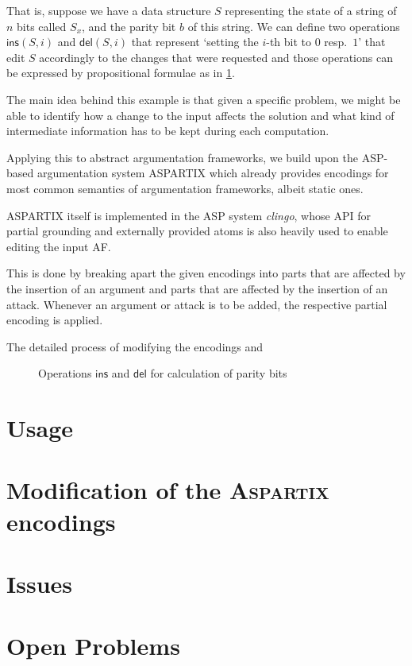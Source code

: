 \documentclass[oneside,12pt]{amsart}
\begin{document}
That is, suppose we have a data structure $S$ representing the state of a
string of $n$ bits called $S_x$, and the parity bit $b$ of this string.
We can define two operations $\mathsf{ins}(S,i)$ and $\mathsf{del}(S,i)$ 
that represent `setting the $i$-th bit to $0$ resp.\ $1$' that edit $S$ 
accordingly to the changes that were requested and those operations 
can be expressed by propositional formulae as in \cref{dynfo-parity}.

The main idea behind this example is that given a specific problem, we 
might be able to identify how a change to the input affects the solution 
and what kind of intermediate information has to be kept during each computation.

Applying this to abstract argumentation frameworks, we build upon the 
ASP-based argumentation system ASPARTIX \cite{aspartix} which already 
provides encodings for most common semantics of argumentation frameworks, albeit static ones.

ASPARTIX itself is implemented in the ASP system \emph{clingo}, whose API 
for partial grounding and externally provided atoms is also heavily used 
to enable editing the input AF.

This is done by breaking apart the given encodings into parts that are affected
by the insertion of an argument and parts that are affected by the 
insertion of an attack. Whenever an argument or attack is to be added,
the respective partial encoding is applied. 

The detailed process of modifying the encodings and 

\begin{figure}
    
    \caption{Operations $\mathsf{ins}$ and $\mathsf{del}$ for calculation of parity bits}
    \label{dynfo-parity}
\end{figure}

\section{Usage}
\section{Modification of the \textsc{Aspartix} encodings}\label{incr-semantics}
\section{Issues}
\section{Open Problems}

\printbibliography
\end{document}
